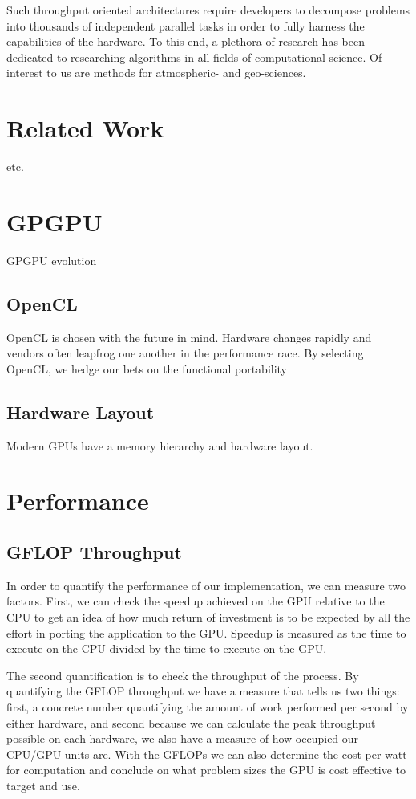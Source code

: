 \documentclass{report}
\begin{document}
Such throughput oriented architectures require developers to decompose problems into thousands of independent parallel tasks in order to fully harness the capabilities of the hardware. To this end, a plethora of research has been dedicated to researching algorithms in all fields of computational science. Of interest to us are methods for atmospheric- and geo-sciences. 

\section{Related Work}
\cite{Bell2009} \cite{Kreuzer2012}
\cite{Vuduc2005} etc. 

\section{GPGPU}
GPGPU evolution
\subsection{OpenCL}
OpenCL is chosen with the future in mind. Hardware changes rapidly and vendors often leapfrog one another in the performance race. By selecting OpenCL, we hedge our bets on the functional portability

\subsection{Hardware Layout}
Modern GPUs have a memory hierarchy and hardware layout. 

\section{Performance}
\subsection{GFLOP Throughput}
In order to quantify the performance of our implementation, we can measure two
factors. First, we can check the speedup achieved on the GPU relative to the
CPU to get an idea of how much return of investment is to be expected by all
the effort in porting the application to the GPU. Speedup is measured as the
time to execute on the CPU divided by the time to execute on the GPU. 

The second quantification is to check the throughput of the process. By
quantifying the GFLOP throughput we have a measure that tells us two things:
first, a concrete number quantifying the amount of work performed per second by
either hardware, and second because we can calculate the peak throughput possible on
each hardware, we also have a measure of how occupied our CPU/GPU units are.
With the GFLOPs we can also determine the cost per watt for computation and
conclude on what problem sizes the GPU is cost effective to target and use. 
\end{document}
